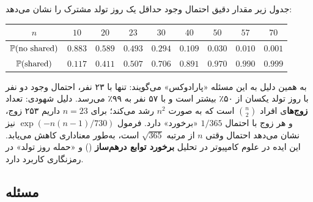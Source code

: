 جدول زیر مقدار دقیق احتمال وجود حداقل یک روز تولد مشترک را نشان می‌دهد:
\begin{center}
\renewcommand{\arraystretch}{1.3}
\begin{tabular}{c|cccccccc}
$n$ & $10$ & $20$ & $23$ & $30$ & $40$ & $50$ & $57$ & $70$\\\hline
$\mathbb{P}(\text{no shared})$ & $0.883$ & $0.589$ & $0.493$ & $0.294$ & $0.109$ & $0.030$ & $0.010$ & $0.001$\\
$\mathbb{P}(\text{shared})$ & $0.117$ & $0.411$ & $0.507$ & $0.706$ & $0.891$ & $0.970$ & $0.990$ & $0.999$
\end{tabular}
\end{center}

\begin{note}
\notetitle به همین دلیل به این مسئله «پارادوکس» می‌گویند: تنها با ۲۳ نفر، احتمال وجود دو نفر با روز تولد یکسان از ۵۰٪ بیشتر است و با ۵۷ نفر به ۹۹٪ می‌رسد. دلیل شهودی: تعداد \textbf{زوج‌ها}ی افراد $\binom n2$ است که به صورت $n^2$ رشد می‌کند؛ برای $n=23$ داریم ۲۵۳ زوج، و هر زوج با احتمال $1/365$ «برخورد» دارد. فرمول $\exp(-n(n-1)/730)$ نیز نشان می‌دهد احتمال وقتی $n$ از مرتبه $\sqrt{365}$ است، به‌طور معناداری کاهش می‌یابد. این ایده در علوم کامپیوتر در تحلیل \textbf{برخورد توابع درهم‌ساز} () و «حمله روز تولد» در رمزنگاری کاربرد دارد.
\end{note}

\subsection{مسئله }

